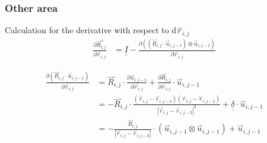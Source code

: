 \documentclass{article}
\renewcommand{\ij}{_{i,j}}
\newcommand{\ijj}{_{i,j-1}}
\newcommand{\ijk}{_{i,j-2}}
\newcommand{\ijjj}{_{i,j-2}}
\newcommand{\magn}[1]{\left\vert #1 \right\vert }
\renewcommand{\part}[2]{\frac{\partial #1 }{\partial #2}}
\newcommand{\harp}{\overset{\rightharpoonup}}
\newcommand{\ten}[1]{\underline{\underline{#1}}}
\newcommand{\rij}{\harp r \ij}
\newcommand{\rijjj}{\harp r \ijjj}
\newcommand{\uijj}{\harp u \ijj}
\begin{document}
 \subsubsection{Other area}

Calculation for the derivative with respect to d$\rij$
\begin{align*}
  \label{eqn:Rperpri}
  \part{\harp R\ij ^ \bot}{\harp r\ij}  &=  \ten{I} 
  - \part{\left(\left(\harp R\ij \cdot \harp u \ijj \right) \otimes 
  \harp u \ijj \right)
  }{\harp r\ij}
\end{align*}

\begin{align*}
  \part{\left(\harp R\ij \cdot \harp u \ijj \right)}{\harp r\ij}   
  &= 
  \harp R\ij \cdot \part{\harp u \ijj}{\harp r \ij} + \part{\harp R \ij}{\harp r \ij} \cdot \harp u\ijj
  \\
  &= 
  - \harp R\ij \cdot  \frac{(\rij - \harp r\ijjj)(\rij - \harp r\ijjj)}
  {\magn{\harp r \ij - \harp r\ijk}^3}
  + \ten{\delta} \cdot \harp u \ijj 
  \\
  &= 
-\frac{\harp R \ij}{\magn{\rij - \rijjj}} \cdot (\uijj \otimes \uijj ) 
+  \uijj
\end{align*}
\end{document}
